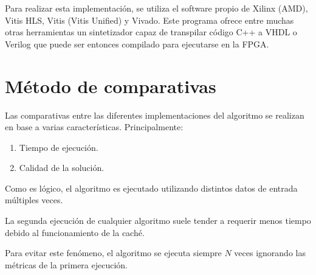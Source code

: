 Para realizar esta implementación,
se utiliza el software propio de Xilinx (AMD),
Vitis HLS, Vitis (Vitis Unified) y Vivado\@.
Este programa ofrece entre muchas otras herramientas
un sintetizador capaz de transpilar código C++ a VHDL o Verilog
que puede ser entonces compilado
para ejecutarse en la FPGA\@.

\pagebreak
\section{Método de comparativas}

Las comparativas entre las diferentes implementaciones
del algoritmo se realizan en base a varias características.
Principalmente:

\begin{enumerate}[start=0, itemsep=0.25px]
    \item Tiempo de ejecución.
    \item Calidad de la solución.
\end{enumerate}

Como es lógico, el algoritmo es ejecutado utilizando
distintos datos de entrada múltiples veces.

\begin{notebox}
    La segunda ejecución de cualquier algoritmo suele tender a
    requerir menos tiempo debido al funcionamiento de la caché.
    
    Para evitar este fenómeno, el algoritmo se ejecuta
    siempre $N$ veces ignorando las métricas de la primera ejecución.
\end{notebox}

